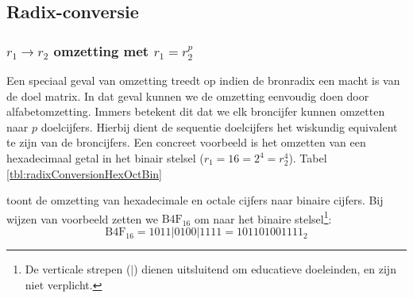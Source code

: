 \subsection{Radix-conversie}
\subsubsection{$r_1\rightarrow r_2$ omzetting met $r_1=r_2^p$}
Een speciaal geval van omzetting treedt op indien de bronradix een macht is van de doel matrix. In dat geval kunnen we de omzetting eenvoudig doen door alfabetomzetting. Immers betekent dit dat we elk broncijfer kunnen omzetten naar $p$ doelcijfers. Hierbij dient de sequentie doelcijfers het wiskundig equivalent te zijn van de broncijfers. Een concreet voorbeeld is het omzetten van een hexadecimaal getal in het binair stelsel ($r_1=16=2^4=r_2^4$). Tabel \ref{tbl:radixConversionHexOctBin}
\begin{table}[hbt]
\centering
{}
\caption{Radix-conversie van hexadecimaal en octaal naar binair.}
\label{tbl:radixConversionHexOctBin}
\end{table}
toont de omzetting van hexadecimale en octale cijfers naar binaire cijfers. Bij wijzen van voorbeeld zetten we $\mbox{B4F}_{16}$ om naar het binaire stelsel\footnote{De verticale strepen ($|$) dienen uitsluitend om educatieve doeleinden, en zijn niet verplicht.}:
\begin{equation}
\mbox{B4F}_{16}=1011|0100|1111=101101001111_2
\end{equation}
